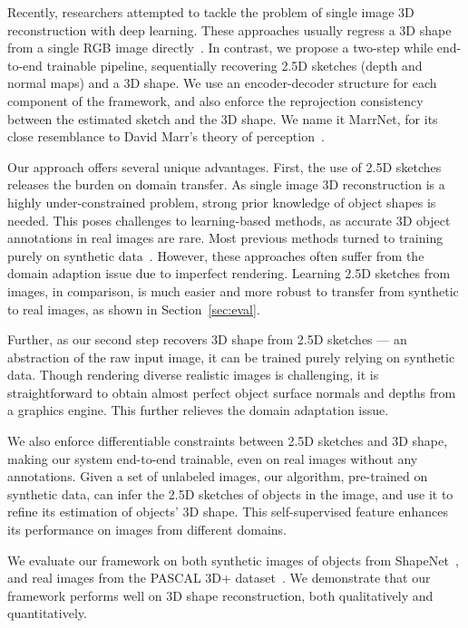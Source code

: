 \documentclass{article}
\newcommand{\sect}[1]{Section~\ref{#1}}
\begin{document}
Recently, researchers attempted to tackle the problem of single image 3D reconstruction with deep learning. These approaches usually regress a 3D shape from a single RGB image directly~\citep{tulsiani2017multi,Choy2016,Wu2016}. In contrast, we propose a two-step while end-to-end trainable pipeline, sequentially recovering 2.5D sketches (depth and normal maps) and a 3D shape. We use an encoder-decoder structure for each component of the framework, and also enforce the reprojection consistency between the estimated sketch and the 3D shape. We name it MarrNet, for its close resemblance to David Marr's theory of perception~\citep{Marr1982}.

Our approach offers several unique advantages. First, the use of 2.5D sketches releases the burden on domain transfer. As single image 3D reconstruction is a highly under-constrained problem, strong prior knowledge of object shapes is needed. This poses challenges to learning-based methods, as accurate 3D object annotations in real images are rare. Most previous methods turned to training purely on synthetic data~\citep{tulsiani2017multi,Choy2016,Girdhar2016}. However, these approaches often suffer from the domain adaption issue due to imperfect rendering. Learning 2.5D sketches from images, in comparison, is much easier and more robust to transfer from synthetic to real images, as shown in \sect{sec:eval}.

Further, as our second step recovers 3D shape from 2.5D sketches --- an abstraction of the raw input image, it can be trained purely relying on synthetic data. Though rendering diverse realistic images is challenging, it is straightforward to obtain almost perfect object surface normals and depths from a graphics engine. This further relieves the domain adaptation issue. 

We also enforce differentiable constraints between 2.5D sketches and 3D shape, making our system end-to-end trainable, even on real images without any annotations. Given a set of unlabeled images, our algorithm, pre-trained on synthetic data, can infer the 2.5D sketches of objects in the image, and use it to refine its estimation of objects' 3D shape. This self-supervised feature enhances its performance on images from different domains.

We evaluate our framework on both synthetic images of objects from ShapeNet~\citep{Chang2015}, and real images from the PASCAL 3D+ dataset~\citep{Xiang2014}. We demonstrate that our framework performs well on 3D shape reconstruction, both qualitatively and quantitatively. 
\end{document}
